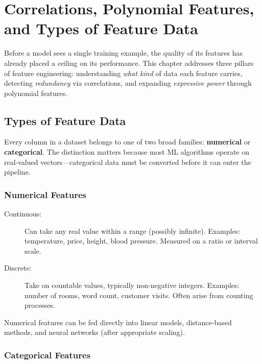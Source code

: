 \chapter*{Correlations, Polynomial Features, and Types of Feature Data}

Before a model sees a single training example, the quality of its features has already placed a ceiling on its performance.
This chapter addresses three pillars of feature engineering: understanding \emph{what kind} of data each feature carries, detecting \emph{redundancy} via correlations, and expanding \emph{expressive power} through polynomial features.

\section*{Types of Feature Data}

Every column in a dataset belongs to one of two broad families: \textbf{numerical} or \textbf{categorical}. The distinction matters because most ML algorithms operate on real-valued vectors---categorical data must be converted before it can enter the pipeline.

\subsection*{Numerical Features}

\begin{description}
    \item[Continuous:] Can take any real value within a range (possibly infinite). Examples: temperature, price, height, blood pressure. Measured on a ratio or interval scale.
    \item[Discrete:] Take on countable values, typically non-negative integers. Examples: number of rooms, word count, customer visits. Often arise from counting processes.
\end{description}

Numerical features can be fed directly into linear models, distance-based methods, and neural networks (after appropriate scaling).

\subsection*{Categorical Features}

